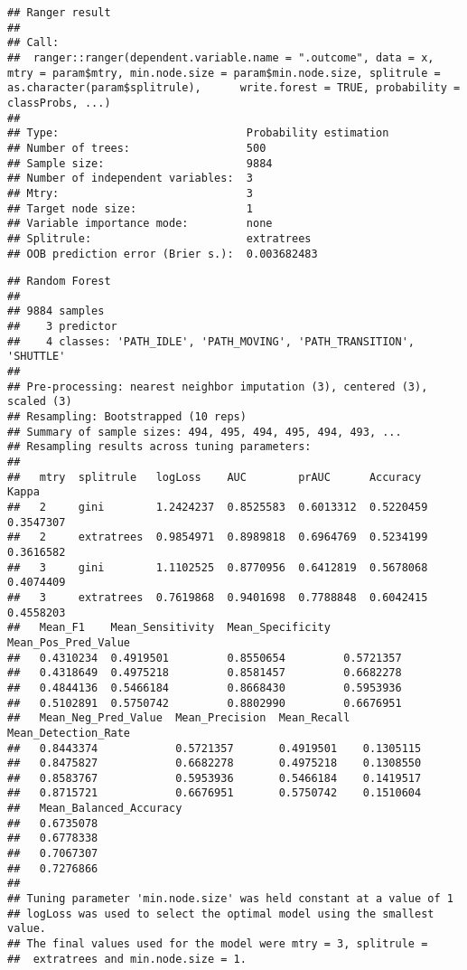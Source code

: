 \documentclass[]{article}
\begin{document}
\begin{verbatim}
## Ranger result
## 
## Call:
##  ranger::ranger(dependent.variable.name = ".outcome", data = x,      mtry = param$mtry, min.node.size = param$min.node.size, splitrule = as.character(param$splitrule),      write.forest = TRUE, probability = classProbs, ...) 
## 
## Type:                             Probability estimation 
## Number of trees:                  500 
## Sample size:                      9884 
## Number of independent variables:  3 
## Mtry:                             3 
## Target node size:                 1 
## Variable importance mode:         none 
## Splitrule:                        extratrees 
## OOB prediction error (Brier s.):  0.003682483
\end{verbatim}

\begin{verbatim}
## Random Forest 
## 
## 9884 samples
##    3 predictor
##    4 classes: 'PATH_IDLE', 'PATH_MOVING', 'PATH_TRANSITION', 'SHUTTLE' 
## 
## Pre-processing: nearest neighbor imputation (3), centered (3), scaled (3) 
## Resampling: Bootstrapped (10 reps) 
## Summary of sample sizes: 494, 495, 494, 495, 494, 493, ... 
## Resampling results across tuning parameters:
## 
##   mtry  splitrule   logLoss    AUC        prAUC      Accuracy   Kappa    
##   2     gini        1.2424237  0.8525583  0.6013312  0.5220459  0.3547307
##   2     extratrees  0.9854971  0.8989818  0.6964769  0.5234199  0.3616582
##   3     gini        1.1102525  0.8770956  0.6412819  0.5678068  0.4074409
##   3     extratrees  0.7619868  0.9401698  0.7788848  0.6042415  0.4558203
##   Mean_F1    Mean_Sensitivity  Mean_Specificity  Mean_Pos_Pred_Value
##   0.4310234  0.4919501         0.8550654         0.5721357          
##   0.4318649  0.4975218         0.8581457         0.6682278          
##   0.4844136  0.5466184         0.8668430         0.5953936          
##   0.5102891  0.5750742         0.8802990         0.6676951          
##   Mean_Neg_Pred_Value  Mean_Precision  Mean_Recall  Mean_Detection_Rate
##   0.8443374            0.5721357       0.4919501    0.1305115          
##   0.8475827            0.6682278       0.4975218    0.1308550          
##   0.8583767            0.5953936       0.5466184    0.1419517          
##   0.8715721            0.6676951       0.5750742    0.1510604          
##   Mean_Balanced_Accuracy
##   0.6735078             
##   0.6778338             
##   0.7067307             
##   0.7276866             
## 
## Tuning parameter 'min.node.size' was held constant at a value of 1
## logLoss was used to select the optimal model using the smallest value.
## The final values used for the model were mtry = 3, splitrule =
##  extratrees and min.node.size = 1.
\end{verbatim}
\end{document}
